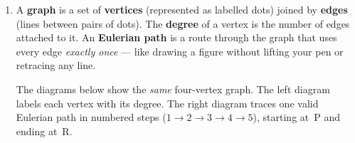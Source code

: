 \documentclass[a4paper,12pt]{article}
\newenvironment{choices}{%
  \begin{enumerate}[label=\textbf{(\Alph*)},
                    leftmargin=2.5em,
                    itemsep=2pt,
                    topsep=4pt,
                    parsep=0pt]%
}{%
  \end{enumerate}%
}
\begin{document}
\begin{enumerate}[label=\textbf{Q\arabic*.},
                  itemsep=3.5ex,
                  leftmargin=3.8em,
                  parsep=0pt]
\begin{choices}
  \item \texttt{D, E, B, F, C, A}
  \item \texttt{D, B, E, F, C, A}
  \item \texttt{D, E, B, C, F, A}
  \item \texttt{E, D, B, F, C, A}
  \item \texttt{E, D, B, C, F, A}
\end{choices}

\item A \textbf{graph} is a set of \textbf{vertices} (represented as labelled
dots) joined by \textbf{edges} (lines between pairs of dots). The
\textbf{degree} of a vertex is the number of edges attached to it.
An \textbf{Eulerian path} is a route through the graph that uses every edge
\emph{exactly once} --- like drawing a figure without lifting your pen or
retracing any line.

\medskip
The diagrams below show the \emph{same} four-vertex graph. The left diagram
labels each vertex with its degree. The right diagram traces one valid Eulerian
path in numbered steps ($1\to2\to3\to4\to5$), starting at~P and ending at~R.

\smallskip
\begin{center}
\begin{minipage}[b]{0.44\linewidth}
\centering
{}
\end{minipage}
\end{center}
\end{enumerate}
\end{document}

